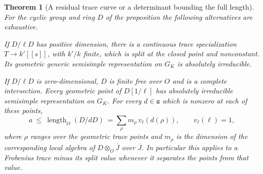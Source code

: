 \documentclass[a4paper,11pt]{article}
\newtheorem{theorem}[proposition]{Theorem}
\theoremstyle{definition}
\theoremstyle{remark}
\numberwithin{equation}{section}
\begin{document}
\begin{theorem}[A residual trace curve or a determinant bounding the full length]
\label{thm:cyclicstrict397}
For the cyclic group and ring \(D\) of the proposition the
following alternatives are exhaustive.

If \(D/\ell D\) has positive dimension, there is a continuous
trace specialization \(T\to k'[[s]]\), with \(k'/k\) finite,
which is split at the closed point and nonconstant. Its geometric
generic semisimple representation on \(G_K\) is absolutely
irreducible.

If \(D/\ell D\) is zero-dimensional, \(D\) is finite free
over \(O\) and is a complete intersection. Every geometric
point of \(D[1/\ell]\) has absolutely irreducible semisimple
representation on \(G_K\). For every \(d\in\mathfrak a\)
which is nonzero at each of these points,
\[
 a\ \le\ \operatorname{length}_O(D/dD)
     \ =\sum_\rho m_\rho\,v_\ell(d(\rho)),\qquad v_\ell(\ell)=1 ,
\]
where \(\rho\) ranges over the geometric trace points and
\(m_\rho\) is the dimension of the corresponding local
algebra of \(D\otimes_O\overline J\) over \(\overline J\).
In particular this applies to a Frobenius trace minus its
split value whenever it separates the points from that value.
\end{theorem}
\end{document}
